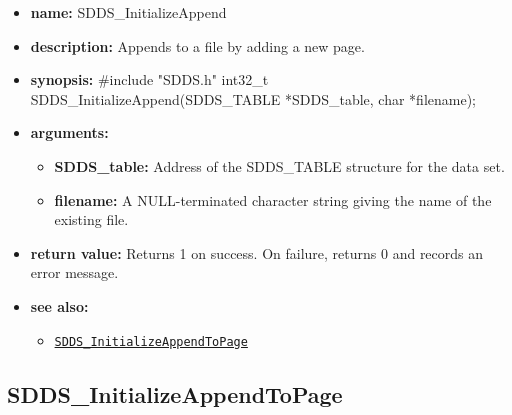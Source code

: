 \documentclass[11pt]{article}
\newcommand{\progref}[1]{\hyperref[SDDS_#1]{\tt SDDS\_#1}}
\begin{document}
\begin{itemize}
\item {\bf name:}\newline
SDDS\_InitializeAppend
\item {\bf description:}\newline
Appends to a file by adding a new page.
\item {\bf synopsis:} \#include "SDDS.h"\newline
int32\_t SDDS\_InitializeAppend(SDDS\_TABLE *SDDS\_table, char *filename);
\item {\bf arguments:}
\begin{itemize}
\item {\bf SDDS\_table:} Address of the SDDS\_TABLE structure for the data set.
\item {\bf filename:} A NULL-terminated character string giving the name of the existing file.
\end{itemize}
\item {\bf return value:}\newline
Returns 1 on success. On failure, returns 0 and records an error message.
\item {\bf see also:}
\begin{itemize}
\item \progref{InitializeAppendToPage}
\end{itemize}
\end{itemize}

\subsection{SDDS\_InitializeAppendToPage}
\label{SDDS_InitializeAppendToPage}
\end{document}
